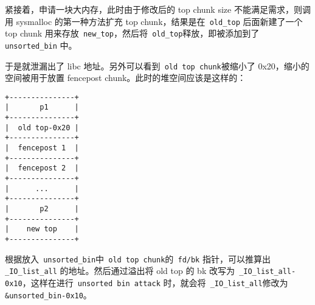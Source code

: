 紧接着，申请一块大内存，此时由于修改后的 top chunk size 不能满足需求，则调用 sysmalloc 的第一种方法扩充 top chunk，结果是在\verb+ old_top+ 后面新建了一个 top chunk 用来存放\verb+ new_top+，然后将\verb+ old_top+释放，即被添加到了\verb+ unsorted_bin+ 中。

于是就泄漏出了 libc 地址。另外可以看到\verb+ old top chunk+被缩小了 0x20，缩小的空间被用于放置 fencepost chunk。此时的堆空间应该是这样的：
\begin{verbatim}
+---------------+
|       p1      |
+---------------+
|  old top-0x20 |
+---------------+
|  fencepost 1  |
+---------------+
|  fencepost 2  |
+---------------+
|      ...      |
+---------------+
|       p2      |
+---------------+
|    new top    |
+---------------+
\end{verbatim}

根据放入\verb+ unsorted_bin+中\verb+ old top chunk+的\verb+ fd/bk+ 指针，可以推算出 \verb+ _IO_list_all+ 的地址。然后通过溢出将 old top 的 bk 改写为\verb| _IO_list_all-0x10|，这样在进行\verb+ unsorted bin attack+ 时，就会将\verb+ _IO_list_all+修改为\verb| &unsorted_bin-0x10|。

